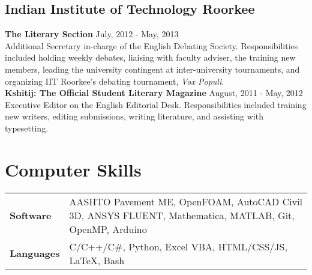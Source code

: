 \documentclass[12pt]{article}
\begin{document}
\subsection*{Indian Institute of Technology Roorkee}
\textbf{The Literary Section} \hfill July, 2012 - May, 2013\\
Additional Secretary in-charge of the English Debating Society. Responsibilities included holding weekly debates, liaising with faculty adviser, the training new members, leading the university contingent at inter-university tournaments, and organizing IIT Roorkee's debating tournament, \textit{Vox Populi}. \\

\textbf{Kshitij: The Official Student Literary Magazine} \hfill August, 2011 - May, 2012\\
Executive Editor on the English Editorial Desk. Responsibilities included training new writers, editing submissions, writing literature, and assisting with typesetting. \\

\section*{Computer Skills}
\begin{tabular}{p{10em} p{25em}} %
\textbf{Software} & AASHTO Pavement ME, OpenFOAM, AutoCAD Civil 3D, ANSYS FLUENT, Mathematica, MATLAB, Git, OpenMP, Arduino \\
\textbf{Languages} & C/C++/C\#, Python, Excel VBA, HTML/CSS/JS, \LaTeX, Bash
\end{tabular}
\end{document}
